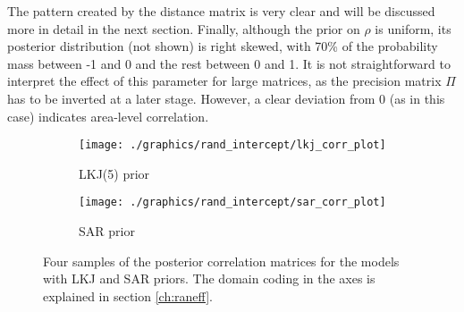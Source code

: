 The pattern created by the distance matrix is very clear and will be discussed more in detail in the next section.
Finally, although the prior on $\rho$ is uniform, its posterior distribution (not shown) is right skewed, with 70\% of the probability mass between -1 and 0 and the rest between 0 and 1.
It is not straightforward to interpret the effect of this parameter for large matrices, as the precision matrix $\Pi$ has to be inverted at a later stage.
However, a clear deviation from 0 (as in this case) indicates area-level correlation.

\begin{figure}
    \begin{subfigure}{\linewidth}
        \centering
        \texttt{[image: ./graphics/rand\_intercept/lkj\_corr\_plot]}
        \caption{LKJ(5) prior}
        \label{fig:heatmap_lkj}
    \end{subfigure}
    \begin{subfigure}{\linewidth}
        \centering
        \texttt{[image: ./graphics/rand\_intercept/sar\_corr\_plot]}
        \caption{SAR prior}
        \label{fig:heatmap_sar}
    \end{subfigure}
    \caption[Correlation matrices for the LKJ and SAR priors.]{Four samples of the posterior correlation matrices for the models with LKJ and SAR priors. The domain coding in the axes is explained in section \ref{ch:raneff}.}
    \label{fig:corr_heatmap}
\end{figure}

